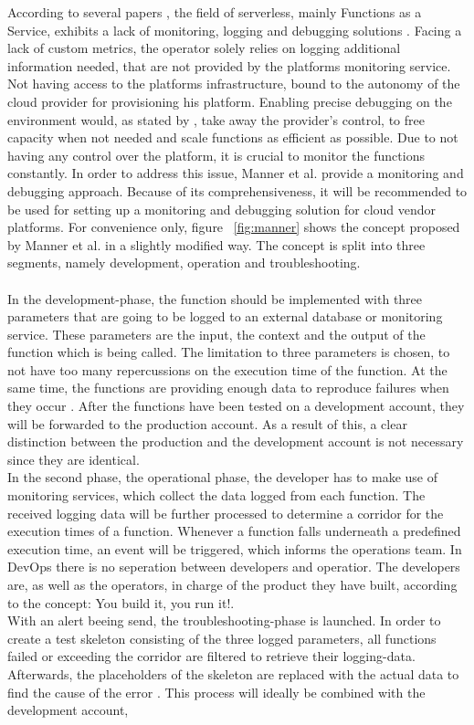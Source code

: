 \documentclass[a4paper,twoside,11pt, pagesize]{scrartcl}
\begin{document}
\begin{spacing}{1.2}
According to several papers \cite{roberts2017serverless} \cite{baldini2017serverless}, the field of serverless, mainly Functions as a Service, exhibits a lack of monitoring, logging and debugging solutions \cite{kritikos2018review}. Facing a lack of custom metrics, the operator solely relies on logging additional information needed, that are not provided by the platforms monitoring service. Not having access to the platforms infrastructure, bound to the autonomy of the cloud provider for provisioning his platform. Enabling precise debugging on the environment would, as stated by \cite{manner2019troubleshooting}, take away the provider's control, to free capacity when not needed and scale functions as efficient as possible. Due to not having any control over the platform, it is crucial to monitor the functions constantly. In order to address this issue, Manner et al. provide a monitoring and debugging approach. Because of its comprehensiveness, it will be recommended to be used for setting up a monitoring and debugging solution for cloud vendor platforms. For convenience only, figure ~\ref{fig:manner} shows the concept proposed by Manner et al. in a slightly modified way. The concept is split into three segments, namely development, operation and troubleshooting.\\\\ In the development-phase, the function should be implemented with three parameters that are going to be logged to an external database or monitoring service. These parameters are the input, the context and the output of the function which is being called. The limitation to three parameters is chosen, to not have too many repercussions on the execution time of the function. At the same time, the functions are providing enough data to reproduce failures when they occur \cite{manner2019troubleshooting}. After the functions have been tested on a development account, they will be forwarded to the production account. As a result of this, a clear distinction between the production and the development account is not necessary since they are identical. \\ In the second phase, the operational phase, the developer has to make use of monitoring services, which collect the data logged from each function. The received logging data will be further processed to determine a corridor for the execution times of a function. Whenever a function falls underneath a predefined execution time, an event will be triggered, which informs the operations team. In DevOps there is no seperation between developers and operatior. The developers are, as well as the operators, in charge of the product they have built, according to the concept: \glqq You build it, you run it!\grqq{}.\\ With an alert beeing send, the troubleshooting-phase is launched. In order to create a test skeleton consisting of the three logged parameters, all functions failed or exceeding the corridor are filtered to retrieve their logging-data. Afterwards, the placeholders of the skeleton are replaced with the actual data to find the cause of the error \cite{manner2019troubleshooting}. This process will ideally be combined with the development account, 
\end{spacing}
\end{document}
